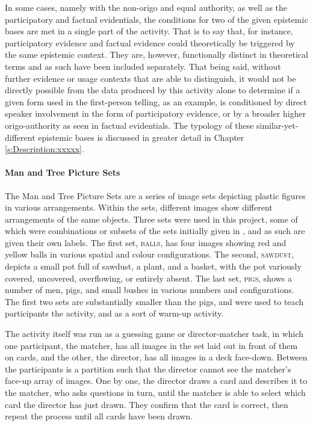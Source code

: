 In some cases, namely with the non-origo and equal authority, as well as the participatory and factual evidentials, the conditions for two of the given epistemic bases are met in a single part of the activity. That is to say that, for instance, participatory evidence and factual evidence could theoretically be triggered by the same epistemic context. They are, however, functionally distinct in theoretical terms and as such have been included separately. That being said, without further evidence or usage contexts that are able to distinguish, it would not be directly possible from the data produced by this activity alone to determine if a given form used in the first-person telling, as an example, is conditioned by direct speaker involvement in the form of participatory evidence, or by a broader higher origo-authority as seen in factual evidentials. The typology of these similar-yet-different epistemic bases is discussed in greater detail in Chapter \ref{s:Description:xxxxx}.

\paragraph{Man and Tree Picture Sets}
The Man and Tree Picture Sets \cite{Levinson1992} are a series of image sets depicting plastic figures in various arrangements. Within the sets, different images show different arrangements of the same objects. Three sets were used in this project, some of which were combinations or subsets of the sets initially given in , and as such are given their own labels. The first set, \textsc{balls}, has four images showing red and yellow balls in various spatial and colour configurations. The second, \textsc{sawdust}, depicts a small pot full of sawdust, a plant, and a basket, with the pot variously covered, uncovered, overflowing, or entirely absent. The last set, \textsc{pigs}, shows a number of men, pigs, and small bushes in various numbers and configurations. The first two sets are substantially smaller than the {pigs}, and were used to teach participants the activity, and as a sort of warm-up activity.

The activity itself was run as a guessing game or director-matcher task, in which one participant, the matcher, has all images in the set laid out in front of them on cards, and the other, the director, has all images in a deck face-down. Between the participants is a partition such that the director cannot see the matcher's face-up array of images. One by one, the director draws a card and describes it to the matcher, who asks questions in turn, until the matcher is able to select which card the director has just drawn. They confirm that the card is correct, then repeat the process until all cards have been drawn.

